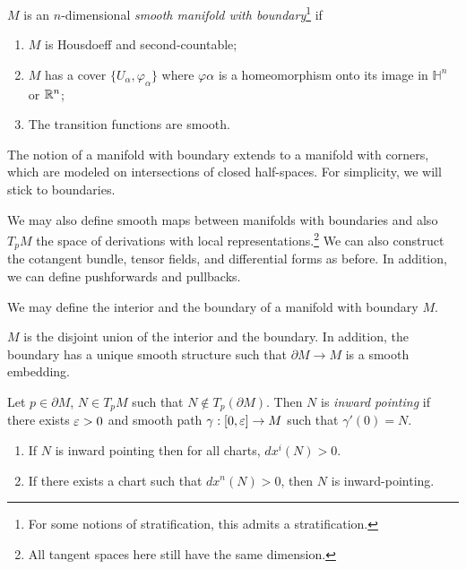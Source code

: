\documentclass[twoside, 10pt]{article}
\begin{document}
    \begin{defn}
        $M$ is an $n$-dimensional \textit{smooth manifold with boundary}\footnote{For some notions of stratification, this admits a stratification.} if
        \begin{enumerate}
            \item $M$ is Housdoeff and second-countable;
            \item $M$ has a cover $\{U_{\alpha}, \varphi_{\alpha}\}$ where $\varphi{\alpha}$ is a homeomorphism onto its image in $\mathbb{H}^n$ or $\mathbb{R}^n$;
            \item The transition functions are smooth.
        \end{enumerate}
    \end{defn}

    The notion of a manifold with boundary extends to a manifold with corners, which are modeled on intersections of closed half-spaces. For simplicity, we will stick to boundaries.

    We may also define smooth maps between manifolds with boundaries and also $T_pM$ the space of derivations with local representations.\footnote{All tangent spaces here still have the same dimension.} We can also construct the cotangent bundle, tensor fields, and differential forms as before. In addition, we can define pushforwards and pullbacks.

    \begin{defn}
        We may define the interior and the boundary of a manifold with boundary $M$.
    \end{defn}

    \begin{prop}
        $M$ is the disjoint union of the interior and the boundary. In addition, the boundary has a unique smooth structure such that $\partial M \to M$ is a smooth embedding.
    \end{prop}

    \begin{defn}
        Let $p \in \partial M$, $N \in T_pM$ such that $N \notin T_p(\partial M)$. Then $N$ is \textit{inward pointing} if there exists $\varepsilon > 0$ and smooth path $\gamma: [0,\varepsilon] \to M$ such that $\gamma'(0) = N$.
    \end{defn}

    \begin{lem}
        \begin{enumerate}
            \item If $N$ is inward pointing then for all charts, $dx^i(N) > 0$.
            \item If there exists a chart such that $dx^n(N) > 0$, then $N$ is inward-pointing.
        \end{enumerate}
    \end{lem}
\end{document}

